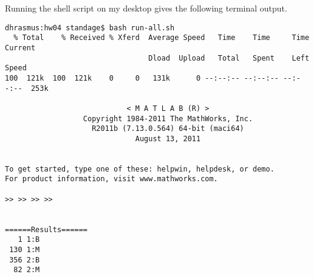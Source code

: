 \documentclass[a4paper, 10pt]{article}
\begin{document}
Running the shell script on my desktop gives the following terminal output.

\bigskip
\begin{verbatim}
dhrasmus:hw04 standage$ bash run-all.sh 
  % Total    % Received % Xferd  Average Speed   Time    Time     Time  Current
                                 Dload  Upload   Total   Spent    Left  Speed
100  121k  100  121k    0     0   131k      0 --:--:-- --:--:-- --:--:--  253k

                            < M A T L A B (R) >
                  Copyright 1984-2011 The MathWorks, Inc.
                    R2011b (7.13.0.564) 64-bit (maci64)
                              August 13, 2011

 
To get started, type one of these: helpwin, helpdesk, or demo.
For product information, visit www.mathworks.com.
 
>> >> >> >> 


======Results======
   1 1:B
 130 1:M
 356 2:B
  82 2:M
\end{verbatim}
\bigskip
\end{document}
